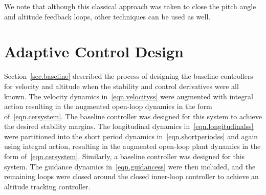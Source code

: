 \documentclass[]{../sty/aiaa-tc}
\theoremstyle{examplestyle}
\begin{document}
  We note that although this classical approach was taken to close the pitch angle and altitude feedback loops, other techniques can be used as well.

  \section{Adaptive Control Design}\label{sec.innerloopadaptive}

  Section~\ref{sec.baseline} described the process of designing the baseline controllers for velocity and altitude when the stability and control derivatives were all known.
  The velocity dynamics in\ \eqref{eqn.velocityss} were augmented with integral action resulting in the augmented open-loop dynamics in the form of\ \eqref{eqn.cersystem}.
  The baseline controller was designed for this system to achieve the desired stability margins.
  The longitudinal dynamics in\ \eqref{eqn.longitudinalss} were partitioned into the short period dynamics in\ \eqref{eqn.shortperiodss} and again using integral action, resulting in the augmented open-loop plant dynamics in the form of\ \eqref{eqn.cersystem}.
  Similarly, a baseline controller was designed for this system.
  The guidance dynamics in\ \eqref{eqn.guidancess} were then included, and the remaining loops were closed around the closed inner-loop controller to achieve an altitude tracking controller.
\end{document}
